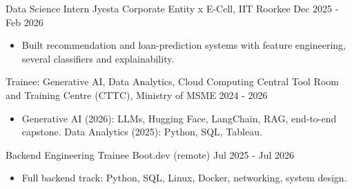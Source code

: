 
\cventry
{Data Science Intern}
{Jyesta Corporate Entity x E-Cell, IIT Roorkee}
{Dec 2025 - Feb 2026}
\begin{itemize}
\item Built recommendation and loan-prediction systems with feature engineering, several classifiers and explainability.
\end{itemize}

\vspace{4pt}

\cventry
{Trainee: Generative AI, Data Analytics, Cloud Computing}
{Central Tool Room and Training Centre (CTTC), Ministry of MSME}
{2024 - 2026}
\begin{itemize}
\item Generative AI (2026): LLMs, Hugging Face, LangChain, RAG, end-to-end capstone. Data Analytics (2025): Python, SQL, Tableau.
\end{itemize}

\vspace{4pt}

\cventry
{Backend Engineering Trainee}
{Boot.dev (remote)}
{Jul 2025 - Jul 2026}
\begin{itemize}
\item Full backend track: Python, SQL, Linux, Docker, networking, system design.
\end{itemize}

